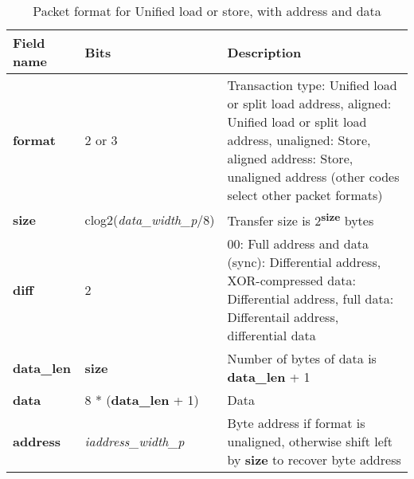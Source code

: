 \begin{table}[htp]
  \centering
  \caption{Packet format for Unified load or store, with address and data}
  \label{tab:te_datadx0y0}
  \begin{tabulary}{\textwidth}{|l|p{40mm}|p{90mm}|}
    \hline
    {\bf Field name} & {\bf Bits} & {\bf Description} \\
    \hline
    \textbf{format} & 	2 or 3	& Transaction type: Unified load or split load address, aligned: Unified load or split load address, unaligned: Store, aligned address: Store, unaligned address\newline	
		(other codes select other packet formats)\\
    \hline
    \textbf{size} & clog2(\textit{data\_width\_p}/8) & Transfer size is 2\textsuperscript{\textbf{size}} bytes \\
    \hline
    \textbf{diff} & 2 & 00: Full address and data (sync): Differential address, XOR-compressed data: Differential address, full data: Differentail address, differential data\\
    \hline
    \textbf{data\_len}	& \textbf{size} & Number of bytes of data is \textbf{data\_len} + 1	\\
    \hline
    \textbf{data} & 8 * (\textbf{data\_len} + 1) & 
                Data\\
    \hline
    \textbf{address} &  \textit{iaddress\_width\_p} & Byte address if format is unaligned, otherwise shift left by \textbf{size} to recover byte address \\
    \hline
  \end{tabulary}
\end{table}


